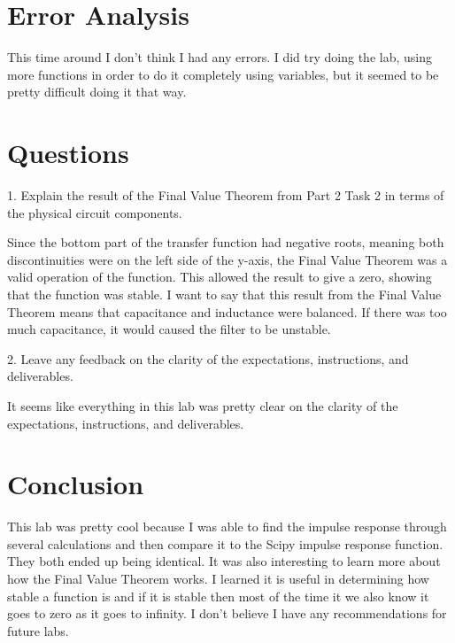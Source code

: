 \documentclass[12pt]{report}
\begin{document}
\section{Error Analysis}
This time around I don't think I had any errors. I did try doing the lab,
using more functions in order to do it completely using variables, but it 
seemed to be pretty difficult doing it that way.

\section{Questions}
1. Explain the result of the Final Value Theorem from Part 2 Task 2 in
terms of the physical circuit components.

Since the bottom part of the transfer function had negative roots, meaning
both discontinuities were on the left side of the y-axis, the Final Value
Theorem was a valid operation of the function. This allowed the result to
give a zero, showing that the function was stable. I want to say that this result from the
Final Value Theorem means that capacitance and
inductance were balanced. If there was too 
much capacitance, it would caused the filter
to be unstable.

2. Leave any feedback on the clarity of the expectations, instructions, and deliverables.

It seems like everything in this lab was pretty clear on the clarity of the
expectations, instructions, and deliverables. 

\section{Conclusion}
This lab was pretty cool because I was able to find the impulse response
through several calculations and then compare it to the Scipy impulse
response function. They both ended up being identical. It was also interesting to learn
more about how the Final Value Theorem works. I learned it is useful in determining
how stable a function is and if it is stable then most of the time it we also know it
goes to zero as it goes to infinity. I don't believe I have any recommendations for
future labs. 
\end{document}
